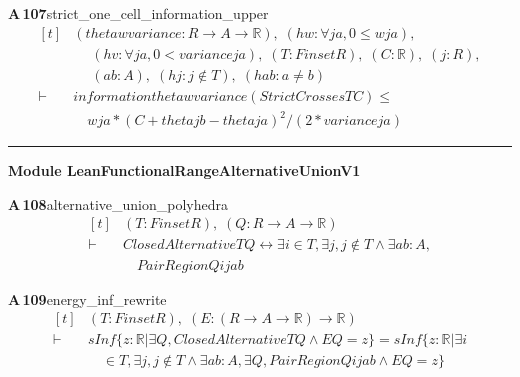 \documentclass[conference]{IEEEtran}
\theoremstyle{definition}
\newcommand{\lean}[1]{\textsf{\footnotesize #1}}
\begin{document}
\noindent\textbf{A\,107}\quad\lean{strict\_one\_cell\_information\_upper}
{\footnotesize\[ \begin{aligned}[t]
&(\mathit{theta} \mathit{w} \mathit{variance} : \mathit{R} \to \mathit{A} \to \mathbb{R} ),\; (\mathit{hw} : \forall \mathit{j} \mathit{a},0 \leq \mathit{w} \mathit{j} \mathit{a}),\\
&\quad \; (\mathit{hv} : \forall \mathit{j} \mathit{a},0 < \mathit{variance} \mathit{j} \mathit{a}),\; (\mathit{T} : \mathit{Finset} \mathit{R}),\; (\mathit{C} : \mathbb{R} ),\; (\mathit{j} : \mathit{R}),\\
&\quad \; (\mathit{a} \mathit{b} : \mathit{A}),\; (\mathit{hj} : \mathit{j} \notin \mathit{T}),\; (\mathit{hab} : \mathit{a} \neq \mathit{b})\\
\vdash\;&\mathit{information} \mathit{theta} \mathit{w} \mathit{variance} (\mathit{StrictCrosses} \mathit{T} \mathit{C}) \leq\\
&\quad \mathit{w} \mathit{j} \mathit{a}*(\mathit{C}+\mathit{theta} \mathit{j} \mathit{b}-\mathit{theta} \mathit{j} \mathit{a})^{2}/(2*\mathit{variance} \mathit{j} \mathit{a})
\end{aligned} \]}

\vspace{4pt}\noindent\rule{\columnwidth}{0.4pt}\par\vspace{2pt}
\noindent\textbf{Module \lean{LeanFunctionalRangeAlternativeUnionV1}}\par\vspace{3pt}

\noindent\textbf{A\,108}\quad\lean{alternative\_union\_polyhedra}
{\footnotesize\[ \begin{aligned}[t]
&(\mathit{T} : \mathit{Finset} \mathit{R}),\; (\mathit{Q} : \mathit{R} \to \mathit{A} \to \mathbb{R} )\\
\vdash\;&\mathit{ClosedAlternative} \mathit{T} \mathit{Q} \leftrightarrow \exists \mathit{i} \in \mathit{T}, \exists \mathit{j}, \mathit{j} \notin \mathit{T} \wedge \exists \mathit{a} \mathit{b} : \mathit{A},\\
&\quad \mathit{PairRegion} \mathit{Q} \mathit{i} \mathit{j} \mathit{a} \mathit{b}
\end{aligned} \]}

\noindent\textbf{A\,109}\quad\lean{energy\_inf\_rewrite}
{\footnotesize\[ \begin{aligned}[t]
&(\mathit{T} : \mathit{Finset} \mathit{R}),\; (\mathit{E} : (\mathit{R} \to \mathit{A} \to \mathbb{R} ) \to \mathbb{R} )\\
\vdash\;&\mathit{sInf} \{ \mathit{z} : \mathbb{R} | \exists \mathit{Q}, \mathit{ClosedAlternative} \mathit{T} \mathit{Q} \wedge \mathit{E} \mathit{Q} = \mathit{z}\} = \mathit{sInf} \{ \mathit{z} : \mathbb{R} | \exists \mathit{i}\\
&\quad \in \mathit{T}, \exists \mathit{j}, \mathit{j} \notin \mathit{T} \wedge \exists \mathit{a} \mathit{b} : \mathit{A}, \exists \mathit{Q}, \mathit{PairRegion} \mathit{Q} \mathit{i} \mathit{j} \mathit{a} \mathit{b} \wedge \mathit{E} \mathit{Q} = \mathit{z}\}
\end{aligned} \]}
\end{document}
